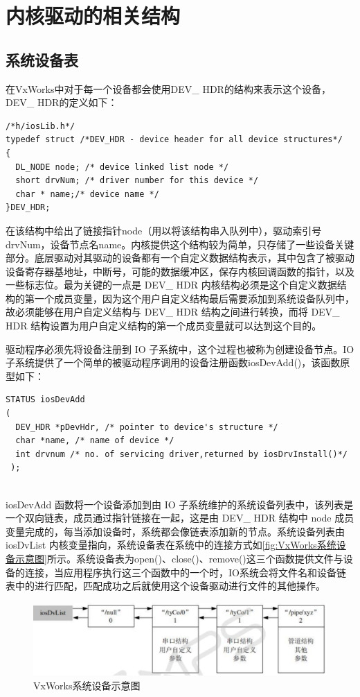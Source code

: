\section{内核驱动的相关结构}
\subsection{系统设备表}
	
	在VxWorks中对于每一个设备都会使用DEV\_ HDR的结构来表示这个设备，DEV\_ HDR的定义如下：
\lstset{language=C}
\begin{lstlisting}
/*h/iosLib.h*/
typedef struct /*DEV_HDR - device header for all device structures*/ 
{ 
  DL_NODE node; /* device linked list node */ 
  short drvNum; /* driver number for this device */ 
  char * name;/* device name */ 
}DEV_HDR;  
\end{lstlisting}

	在该结构中给出了链接指针node（用以将该结构串入队列中），驱动索引号drvNum，设备节点名name。内核提供这个结构较为简单，只存储了一些设备关键部分。底层驱动对其驱动的设备都有一个自定义数据结构表示，其中包含了被驱动设备寄存器基地址，中断号，可能的数据缓冲区，保存内核回调函数的指针，以及一些标志位。最为关键的一点是 DEV\_ HDR 内核结构必须是这个自定义数据结构的第一个成员变量，因为这个用户自定义结构最后需要添加到系统设备队列中，故必须能够在用户自定义结构与 DEV\_ HDR 结构之间进行转换，而将 DEV\_ HDR 结构设置为用户自定义结构的第一个成员变量就可以达到这个目的。
	
	
	驱动程序必须先将设备注册到 IO 子系统中，这个过程也被称为创建设备节点。IO子系统提供了一个简单的被驱动程序调用的设备注册函数iosDevAdd()，该函数原型如下：
\lstset{language=C}
\begin{lstlisting}
STATUS iosDevAdd 
( 
  DEV_HDR *pDevHdr, /* pointer to device's structure */ 
  char *name, /* name of device */ 
  int drvnum /* no. of servicing driver,returned by iosDrvInstall()*/
 ); 
\end{lstlisting}\\
iosDevAdd 函数将一个设备添加到由 IO 子系统维护的系统设备列表中，该列表是一个双向链表，成员通过指针链接在一起，这是由 DEV\_ HDR 结构中 node 成员变量完成的，每当添加设备时，系统都会像链表添加新的节点。系统设备列表由 iosDvList 内核变量指向，系统设备表在系统中的连接方式如\autoref{fig:VxWorks系统设备示意图}所示。系统设备表为open()、close()、remove()这三个函数提供文件与设备的连接，当应用程序执行这三个函数中的一个时，IO系统会将文件名和设备链表中的进行匹配，匹配成功之后就使用这个设备驱动进行文件的其他操作。

\begin{figure}[!h]
\centering
\includegraphics[width=1.0\textwidth]{./graphics/vxworks-device-link.pdf}
\caption{VxWorks系统设备示意图}\label{fig:VxWorks系统设备示意图}
\end{figure}

